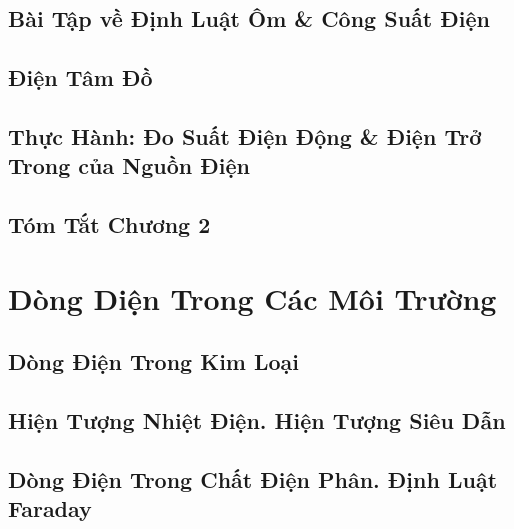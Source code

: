 \documentclass[oneside]{book}
\numberwithin{equation}{section}
\begin{document}

\section{Bài Tập về Định Luật Ôm \& Công Suất Điện}


\section{Điện Tâm Đồ}


\section{Thực Hành: Đo Suất Điện Động \& Điện Trở Trong của Nguồn Điện}


\section{Tóm Tắt Chương 2}


\chapter{Dòng Diện Trong Các Môi Trường}

\section{Dòng Điện Trong Kim Loại}


\section{Hiện Tượng Nhiệt Điện. Hiện Tượng Siêu Dẫn}


\section{Dòng Điện Trong Chất Điện Phân. Định Luật Faraday}
\end{document}
